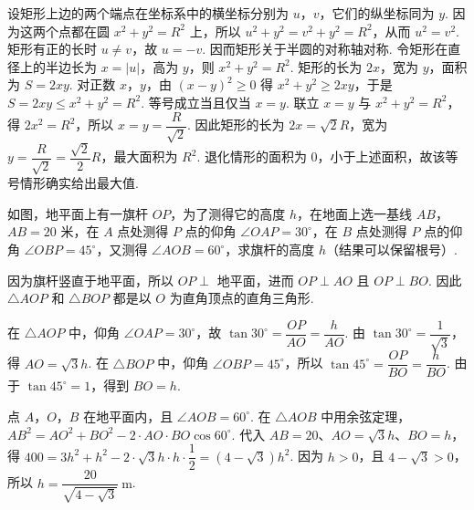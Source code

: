 \documentclass[UTF8,a4paper,oneside,11pt]{ctexbook}
\begin{document}
\begin{solution}
设矩形上边的两个端点在坐标系中的横坐标分别为 \(u\)，\(v\)，它们的纵坐标同为 \(y\). 因为这两个点都在圆 \(x^2+y^2=R^2\) 上，所以 \(u^2+y^2=v^2+y^2=R^2\)，从而 \(u^2=v^2\). 矩形有正的长时 \(u\ne v\)，故 \(u=-v\). 因而矩形关于半圆的对称轴对称. 令矩形在直径上的半边长为 \(x=|u|\)，高为 \(y\)，则 \(x^2+y^2=R^2\). 矩形的长为 \(2x\)，宽为 \(y\)，面积为 \(S=2xy\). 对正数 \(x\)，\(y\)，由 \((x-y)^2\geq0\) 得 \(x^2+y^2\geq2xy\)，于是 \(S=2xy\leq x^2+y^2=R^2\). 等号成立当且仅当 \(x=y\). 联立 \(x=y\) 与 \(x^2+y^2=R^2\)，得 \(2x^2=R^2\)，所以 \(x=y=\dfrac{R}{\sqrt2}\). 因此矩形的长为 \(2x=\sqrt2R\)，宽为 \(y=\dfrac{R}{\sqrt2}=\dfrac{\sqrt2}{2}R\)，最大面积为 \(R^2\). 退化情形的面积为 \(0\)，小于上述面积，故该等号情形确实给出最大值.
\end{solution}

\begin{problem}
如图，地平面上有一旗杆 \(OP\)，为了测得它的高度 \(h\)，在地面上选一基线 \(AB\)，\(AB=20\text{ 米}\)，在 \(A\) 点处测得 \(P\) 点的仰角 \(\angle OAP=30^{\circ}\)，在 \(B\) 点处测得 \(P\) 点的仰角 \(\angle OBP=45^{\circ}\)，又测得 \(\angle AOB=60^{\circ}\)，求旗杆的高度 \(h\)（结果可以保留根号）.

\begin{center}
\end{center}
\end{problem}

\begin{solution}
因为旗杆竖直于地平面，所以 \(OP\perp\) 地平面，进而 \(OP\perp AO\) 且 \(OP\perp BO\). 因此 \(\triangle AOP\) 和 \(\triangle BOP\) 都是以 \(O\) 为直角顶点的直角三角形.

在 \(\triangle AOP\) 中，仰角 \(\angle OAP=30^{\circ}\)，故 \(\tan30^{\circ}=\dfrac{OP}{AO}=\dfrac{h}{AO}\). 由 \(\tan30^{\circ}=\dfrac1{\sqrt3}\)，得 \(AO=\sqrt3h\). 在 \(\triangle BOP\) 中，仰角 \(\angle OBP=45^{\circ}\)，所以 \(\tan45^{\circ}=\dfrac{OP}{BO}=\dfrac{h}{BO}\). 由于 \(\tan45^{\circ}=1\)，得到 \(BO=h\).

点 \(A\)，\(O\)，\(B\) 在地平面内，且 \(\angle AOB=60^{\circ}\). 在 \(\triangle AOB\) 中用余弦定理，\(AB^2=AO^2+BO^2-2\cdot AO\cdot BO\cos60^{\circ}\). 代入 \(AB=20\)、\(AO=\sqrt3h\)、\(BO=h\)，得 \(400=3h^2+h^2-2\cdot\sqrt3h\cdot h\cdot\dfrac12=(4-\sqrt3)h^2\). 因为 \(h>0\)，且 \(4-\sqrt3>0\)，所以 \(h=\dfrac{20}{\sqrt{4-\sqrt3}}\mathrm{~m}\).
\end{solution}
\end{document}
